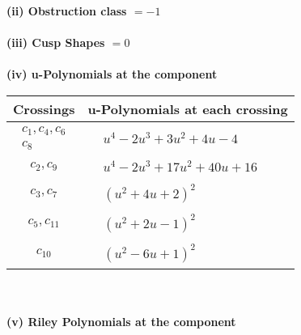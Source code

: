\documentclass[1p]{elsarticle_modified}
\theoremstyle{definition}
\begin{document}
\flushleft \textbf{(ii) Obstruction class $= -1$}\\~\\
\flushleft \textbf{(iii) Cusp Shapes $= 0$}\\~\\
\newpage\renewcommand{\arraystretch}{1}
\flushleft \textbf{(iv) u-Polynomials at the component}\newline \\
\begin{tabular}{m{50pt}|m{274pt}}
Crossings & \hspace{64pt}u-Polynomials at each crossing \\
\hline $$\begin{aligned}c_{1},c_{4},c_{6}\\c_{8}\end{aligned}$$&$\begin{aligned}
&u^4-2 u^3+3 u^2+4 u-4
\end{aligned}$\\
\hline $$\begin{aligned}c_{2},c_{9}\end{aligned}$$&$\begin{aligned}
&u^4-2 u^3+17 u^2+40 u+16
\end{aligned}$\\
\hline $$\begin{aligned}c_{3},c_{7}\end{aligned}$$&$\begin{aligned}
&(u^2+4 u+2)^2
\end{aligned}$\\
\hline $$\begin{aligned}c_{5},c_{11}\end{aligned}$$&$\begin{aligned}
&(u^2+2 u-1)^2
\end{aligned}$\\
\hline $$\begin{aligned}c_{10}\end{aligned}$$&$\begin{aligned}
&(u^2-6 u+1)^2
\end{aligned}$\\
\hline
\end{tabular}\\~\\
\newpage\renewcommand{\arraystretch}{1}
\flushleft \textbf{(v) Riley Polynomials at the component}\newline \\
\end{document}
